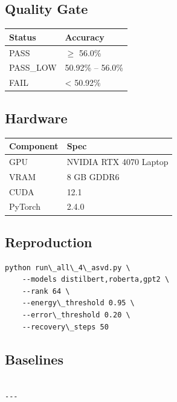 \subsection{Quality Gate}

\begin{table}[H]
\centering
\small
\begin{tabular}{ll}
\toprule
\textbf{Status} & \textbf{Accuracy} \\
\midrule
PASS & $\ge$ 56.0\% \\
PASS\_LOW & 50.92\% -- 56.0\% \\
FAIL & \textless{} 50.92\% \\
\bottomrule
\end{tabular}
\end{table}

\subsection{Hardware}

\begin{table}[H]
\centering
\small
\begin{tabular}{ll}
\toprule
\textbf{Component} & \textbf{Spec} \\
\midrule
GPU & NVIDIA RTX 4070 Laptop \\
VRAM & 8 GB GDDR6 \\
CUDA & 12.1 \\
PyTorch & 2.4.0 \\
\bottomrule
\end{tabular}
\end{table}

\subsection{Reproduction}

\begin{lstlisting}
python run\_all\_4\_asvd.py \
    --models distilbert,roberta,gpt2 \
    --rank 64 \
    --energy\_threshold 0.95 \
    --error\_threshold 0.20 \
    --recovery\_steps 50
\end{lstlisting}

\subsection{Baselines}

\begin{lstlisting}

---
\end{lstlisting}

